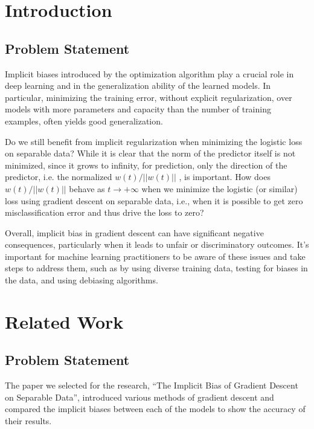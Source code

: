 \chapter {Introduction}

\section{Problem Statement}


Implicit biases introduced by the optimization algorithm play a crucial role in deep learning and in the generalization ability of the learned models. In particular, minimizing the training error, without explicit regularization, over models with more parameters and capacity than the number of training examples, often yields good generalization.

Do we still benefit from implicit regularization when minimizing the logistic loss on separable data? While it is clear that the norm of the predictor itself is not minimized, since it grows to infinity, for prediction, only the direction of the predictor, i.e. the normalized $w(t)/ ||w(t)||$ , is important. How does $w(t)/ ||w(t)||$ behave as $t \rightarrow +\infty$ when we minimize the logistic (or similar) loss using gradient descent on separable data, i.e., when it is possible to get zero misclassification error and thus drive the loss to zero?

Overall, implicit bias in gradient descent can have significant negative consequences, particularly when it leads to unfair or discriminatory outcomes. It's important for machine learning practitioners to be aware of these issues and take steps to address them, such as by using diverse training data, testing for biases in the data, and using debiasing algorithms.

\chapter{Related Work}

\section{Problem Statement}

The paper we selected for the research, “The Implicit Bias of Gradient Descent on Separable Data”, introduced various methods of gradient descent and compared the implicit biases between each of the models to show the accuracy of their results.


